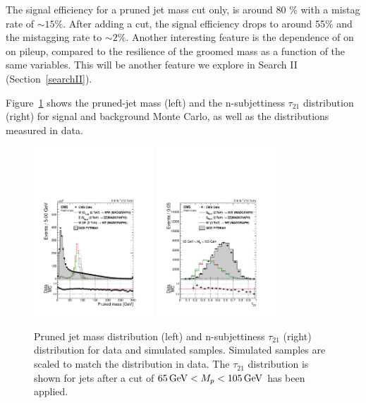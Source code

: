 The signal efficiency for a pruned jet mass cut only, is around 80 \% with a mistag rate of $\sim 15\%$. After adding a \nsubj cut, the signal efficiency drops to around 55\% and the mistagging rate to $\sim 2\%$. Another interesting feature is the dependence of \nsubj on \PT on pileup, compared to the resilience of the groomed mass as a function of the same variables. This will be another feature we explore in Search II (Section~\ref{searchII}).






Figure~\ref{fig:wtag} shows the pruned-jet mass (left) and the n-subjettiness $\tau_{21}$ distribution (right) for signal and background Monte Carlo, as well as the distributions measured in data. 

\begin{figure}[h!]
\centering
\includegraphics[width=0.4\textwidth]{figures/analysis/search1/AN-15-211/controlplots/silverjson/PrunedMass_WSignal.pdf}
\includegraphics[width=0.4\textwidth]{figures/analysis/search1/AN-15-211/controlplots/silverjson/Tau21_punzi_WSignal.pdf}\\
\caption{Pruned jet mass distribution (left) and n-subjettiness $\tau_{21}$ (right) distribution for data and simulated samples. Simulated samples are scaled to match the distribution in data. The $\tau_{21}$ distribution is shown for jets after a cut of $65 {\,\text{Ge\hspace{-.08em}V}} < M_{p} < 105 {\,\text{Ge\hspace{-.08em}V}}$ has been applied.}
\label{fig:wtag}
\end{figure}


